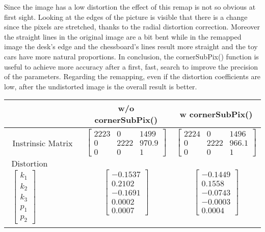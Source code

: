 \documentclass[11pt,a4paper]{article}
\newcommand{\cc}{\fontfamily{txtt}\selectfont}
\begin{document}
Since the image has a low distortion the effect of this remap is not so obvious at first sight.
Looking at the edges of the picture is visible that there is a change since the pixels are stretched, thanks to the radial distortion correction.
Moreover the straight lines in the original image are a bit bent while in the remapped image the desk's edge and the chessboard's lines result more straight and the toy cars have more natural proportions.
In conclusion, the {\cc cornerSubPix()} function is useful to achieve more accuracy after a first, fast, search to improve the precision of the parameters.
Regarding the remapping, even if the distortion coefficients are low, after the undistorted image is  the overall result is better.
\begin{center}
  \begin{table}[ht]
    \centering
    \begin{tabular}{|c | c c|}
      \hline
      & w/o {\cc cornerSubPix()} & w {\cc cornerSubPix()}\\
      \hline
      \hline
      Instrinsic Matrix & 
      $ \begin{bmatrix} 2223& 0& 1499\\
        0& 2222& 970.9\\
        0& 0& 1 \end{bmatrix}$ & 
        $ \begin{bmatrix} 2224& 0& 1496\\
          0& 2222& 966.1\\
          0& 0& 1 \end{bmatrix}$ \\
     \hline
     $\begin{matrix}
     \text{Distortion Coefficients}\\ \begin{bmatrix}k_1\\ k_2\\ k_3\\ p_1\\ p_2 \end{bmatrix} 
     \end{matrix}$ & 
    $\begin{bmatrix}-0.1537\\ 0.2102\\ -0.1691\\ 0.0002\\ 0.0007\end{bmatrix}$ &
     $\begin{bmatrix} -0.1449\\ 0.1558\\ -0.0743\\ -0.0003\\0.0004 \end{bmatrix}$ \\

\end{tabular}
\end{table}
\end{center}
\end{document}
